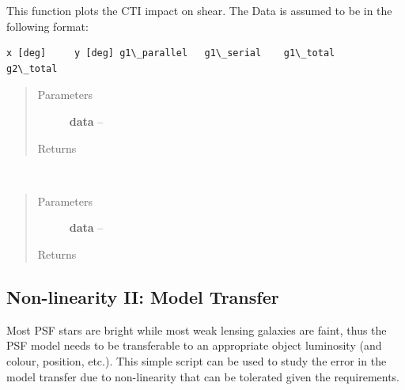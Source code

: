 \documentclass[a4paper,11pt,english]{sphinxmanual}
\begin{document}

\begin{fulllineitems}
\label{analysis:analysis.CTIpower.plotCTIeffect}
This function plots the CTI impact on shear. The Data is assumed to be in the following format:

\begin{Verbatim}[commandchars=\\\{\}]
x [deg]     y [deg] g1\_parallel   g1\_serial    g1\_total    g2\_total
\end{Verbatim}
\begin{quote}\begin{description}
\item[{Parameters}] \leavevmode
\textbf{data} -- 

\item[{Returns}] \leavevmode


\end{description}\end{quote}

\end{fulllineitems}


\begin{fulllineitems}
\label{analysis:analysis.CTIpower.plotPower}~\begin{quote}\begin{description}
\item[{Parameters}] \leavevmode
\textbf{data} -- 

\item[{Returns}] \leavevmode


\end{description}\end{quote}

\end{fulllineitems}

\label{analysis:module-analysis.nonlinearityModelTransfer}

\subsection{Non-linearity II: Model Transfer}
\label{analysis:non-linearity-ii-model-transfer}
Most PSF stars are bright while most weak lensing galaxies are faint,
thus the PSF model needs to be transferable to an appropriate object luminosity (and colour, position, etc.).
This simple script can be used to study the error in the model transfer due to non-linearity that can be
tolerated given the requirements.
\end{document}

